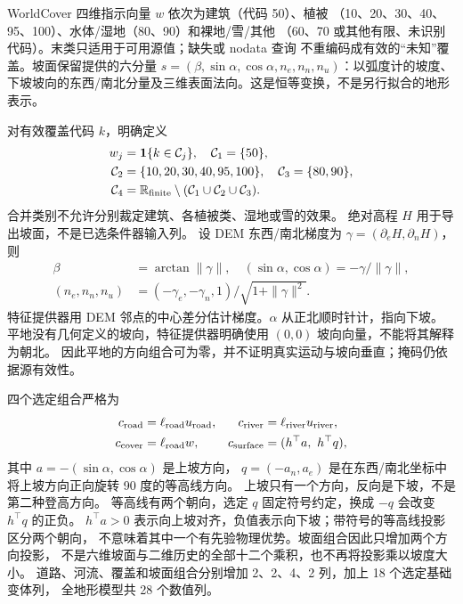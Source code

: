 \documentclass[UTF8,11pt]{ctexart}
\newcommand{\R}{\mathbb{R}}
\begin{document}
WorldCover 四维指示向量 \(w\) 依次为建筑（代码 50）、植被
（10、20、30、40、95、100）、水体/湿地（80、90）和裸地/雪/其他
（60、70 或其他有限、未识别代码）。末类只适用于可用源值；缺失或 nodata 查询
不重编码成有效的“未知”覆盖。坡面保留提供的六分量
\(s=(\beta,\sin\alpha,\cos\alpha,n_e,n_n,n_u)\)：以弧度计的坡度、
下坡坡向的东西/南北分量及三维表面法向。这是恒等变换，不是另行拟合的地形表示。

对有效覆盖代码 \(k\)，明确定义
\begin{equation}
\begin{aligned}
w_j&=\mathbf1\{k\in\mathcal C_j\},\quad \mathcal C_1=\{50\},\\
\mathcal C_2&=\{10,20,30,40,95,100\},\quad\mathcal C_3=\{80,90\},\\
\mathcal C_4&=\R_{\rm finite}\setminus(\mathcal C_1\cup\mathcal C_2\cup\mathcal C_3).
\end{aligned}
\label{eq:cover-indicators}
\end{equation}
合并类别不允许分别裁定建筑、各植被类、湿地或雪的效果。
绝对高程 \(H\) 用于导出坡面，不是已选条件器输入列。
设 DEM 东西/南北梯度为 \(\gamma=(\partial_eH,\partial_nH)\)，则
\begin{equation}
\begin{aligned}
\beta&=\arctan\|\gamma\|,\quad (\sin\alpha,\cos\alpha)=-\gamma/\|\gamma\|,\\
(n_e,n_n,n_u)&=(-\gamma_e,-\gamma_n,1)/\sqrt{1+\|\gamma\|^2}.
\end{aligned}
\label{eq:surface-geometry}
\end{equation}
特征提供器用 DEM 邻点的中心差分估计梯度。\(\alpha\) 从正北顺时针计，指向下坡。
平地没有几何定义的坡向，特征提供器明确使用 \((0,0)\) 坡向向量，不能将其解释为朝北。
因此平地的方向组合可为零，并不证明真实运动与坡向垂直；掩码仍依据源有效性。

四个选定组合严格为
\begin{align}
c_{\rm road}&=\ell_{\rm road}u_{\rm road},&
c_{\rm river}&=\ell_{\rm river}u_{\rm river},\notag\\
c_{\rm cover}&=\ell_{\rm road}w,&
c_{\rm surface}&=(h^\top a,\ h^\top q),
\label{eq:feature-compositions}
\end{align}
其中 \(a=-(\sin\alpha,\cos\alpha)\) 是上坡方向，
\(q=(-a_n,a_e)\) 是在东西/南北坐标中将上坡方向正向旋转 90 度的等高线方向。
上坡只有一个方向，反向是下坡，不是第二种登高方向。
等高线有两个朝向，选定 \(q\) 固定符号约定，换成 \(-q\) 会改变 \(h^\top q\) 的正负。
\(h^\top a>0\) 表示向上坡对齐，负值表示向下坡；带符号的等高线投影区分两个朝向，
不意味着其中一个有先验物理优势。坡面组合因此只增加两个方向投影，
不是六维坡面与二维历史的全部十二个乘积，也不再将投影乘以坡度大小。
道路、河流、覆盖和坡面组合分别增加 2、2、4、2 列，加上 18 个选定基础变体列，
全地形模型共 28 个数值列。
\end{document}
